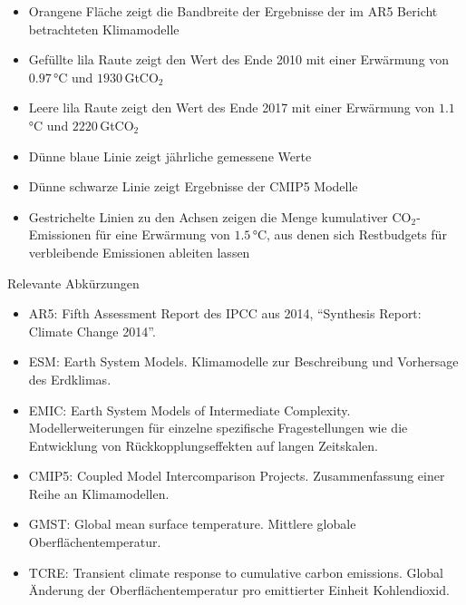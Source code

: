 \begin{frame}
{\begin{itemize}
        \item Orangene Fläche zeigt die Bandbreite der Ergebnisse der im AR5 Bericht betrachteten Klimamodelle
        \item Gefüllte lila Raute zeigt den Wert des Ende 2010 mit einer Erwärmung von $0.97\,$°C und $1930\,$GtCO$_2$
        \item Leere lila Raute zeigt den Wert des Ende 2017 mit einer Erwärmung von $1.1\,$°C und $2220\,$GtCO$_2$
        \item Dünne blaue Linie zeigt jährliche gemessene Werte
        \item Dünne schwarze Linie zeigt Ergebnisse der CMIP5 Modelle
        \item Gestrichelte Linien zu den Achsen zeigen die Menge kumulativer CO$_2$-Emissionen für eine Erwärmung von $1.5\,$°C, aus denen sich Restbudgets für verbleibende Emissionen ableiten lassen
      \end{itemize}

      Relevante Abkürzungen
      \begin{itemize}
        \item AR5: Fifth Assessment Report des IPCC aus 2014, \enquote{Synthesis Report: Climate Change 2014}.
        \item ESM: Earth System Models. Klimamodelle zur Beschreibung und Vorhersage des Erdklimas.
        \item EMIC: Earth System Models of Intermediate Complexity. Modellerweiterungen für einzelne spezifische Fragestellungen wie die Entwicklung von Rückkopplungseffekten auf langen Zeitskalen.
        \item CMIP5: Coupled Model Intercomparison Projects. Zusammenfassung einer Reihe an Klimamodellen.
        \item GMST: Global mean surface temperature. Mittlere globale Oberflächentemperatur.
        \item TCRE: Transient climate response to cumulative carbon emissions. Global Änderung der Oberflächentemperatur pro emittierter Einheit Kohlendioxid.
      \end{itemize}


    }
\end{frame}

